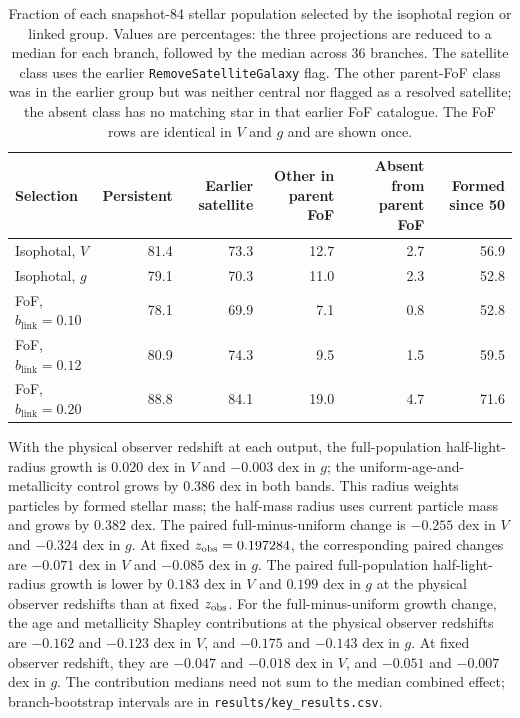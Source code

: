 \documentclass[usenatbib]{mnras}
\begin{document}
\begin{table}
\centering
\caption{Fraction of each snapshot-84 stellar population selected by the
isophotal region or linked group. Values are percentages: the three
projections are reduced to a median for each branch, followed by the median
across 36 branches. The satellite class uses the earlier
\texttt{RemoveSatelliteGalaxy} flag. The other parent-FoF class was in the
earlier group but was neither central nor flagged as a resolved satellite;
the absent class has no matching star in that earlier FoF catalogue. The FoF
rows are identical in $V$ and $g$ and are shown once.}
\label{tab:tng-capture}
\small
\begin{tabular}{lrrrrr}
\toprule
Selection & Persistent & Earlier satellite & Other in parent FoF & Absent from parent FoF & Formed since 50 \\
\midrule
Isophotal, $V$ & 81.4 & 73.3 & 12.7 & 2.7 & 56.9 \\
Isophotal, $g$ & 79.1 & 70.3 & 11.0 & 2.3 & 52.8 \\
FoF, $b_{\mathrm{link}}=0.10$ & 78.1 & 69.9 & 7.1 & 0.8 & 52.8 \\
FoF, $b_{\mathrm{link}}=0.12$ & 80.9 & 74.3 & 9.5 & 1.5 & 59.5 \\
FoF, $b_{\mathrm{link}}=0.20$ & 88.8 & 84.1 & 19.0 & 4.7 & 71.6 \\
\bottomrule
\end{tabular}
\end{table}

With the physical observer redshift at each output, the full-population
half-light-radius growth is $0.020$ dex in $V$ and $-0.003$ dex in $g$;
the uniform-age-and-metallicity control grows by $0.386$ dex in both bands.
This radius weights particles by formed stellar mass; the half-mass radius
uses current particle mass and grows by $0.382$ dex.
The paired full-minus-uniform change is $-0.255$ dex in $V$ and $-0.324$
dex in $g$. At fixed $z_{\rm obs}=0.197284$, the corresponding paired
changes are $-0.071$ dex in $V$ and $-0.085$ dex in $g$. The paired
full-population half-light-radius growth is lower by $0.183$ dex in $V$
and $0.199$ dex in $g$ at the physical observer redshifts than at fixed
$z_{\rm obs}$. For the full-minus-uniform growth change, the age and
metallicity Shapley contributions at the physical observer redshifts are
$-0.162$ and $-0.123$ dex in $V$, and $-0.175$ and $-0.143$ dex in $g$.
At fixed observer redshift, they are $-0.047$ and $-0.018$ dex in $V$, and
$-0.051$ and $-0.007$ dex in $g$. The contribution medians need not sum to
the median combined effect; branch-bootstrap intervals are in
\texttt{results/key\_results.csv}.
\end{document}
